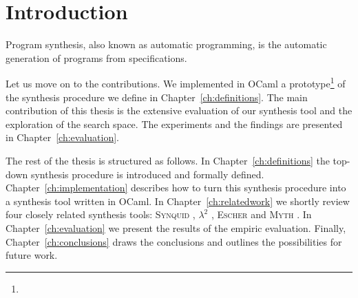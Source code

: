 \newcommand{\package}{\emph}

\chapter{Introduction}\label{ch:introduction}

Program synthesis, also known as automatic programming, is the automatic generation of programs from specifications.

Let us move on to the contributions. We implemented in OCaml a prototype\footnote{} of the synthesis procedure we define in Chapter~\ref{ch:definitions}. The main contribution of this thesis is the extensive evaluation of our synthesis tool and the exploration of the search space. The experiments and the findings are presented in Chapter~\ref{ch:evaluation}.

The rest of the thesis is structured as follows. In Chapter~\ref{ch:definitions} the top-down synthesis procedure is introduced and formally defined. Chapter~\ref{ch:implementation} describes how to turn this synthesis procedure into a synthesis tool written in OCaml. In Chapter~\ref{ch:relatedwork} we shortly review four closely related synthesis tools: \textsc{Synquid} \cite{SynquidPaper}, $\lambda^2$ \cite{LambdaSquarePaper}, \textsc{Escher} \cite{EscherPaper} and \textsc{Myth} \cite{MythPaper}. In Chapter~\ref{ch:evaluation} we present the results of the empiric evaluation. Finally, Chapter~\ref{ch:conclusions} draws the conclusions and outlines the possibilities for future work.


